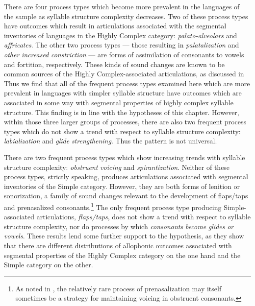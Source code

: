   There are four process types which become more prevalent in the languages of the sample as syllable structure complexity decreases. Two of these process types have outcomes which result in articulations associated with the segmental inventories of languages in the Highly Complex category: \textit{palato-alveolars} and \textit{affricates}. The other two process types — those resulting in \textit{palatalization} and \textit{other} \textit{increased} \textit{constriction} — are forms of assimilation of consonants to vowels and fortition, respectively. These kinds of sound changes are known to be common sources of the Highly Complex-associated articulations, as discussed in  Thus we find that all of the frequent process types examined here which are more prevalent in languages with simpler syllable structure have outcomes which are associated in some way with segmental properties of highly complex syllable structure. This finding is in line with the hypotheses of this chapter. However, within those three larger groups of processes, there are also two frequent process types which do not show a trend with respect to syllable structure complexity: \textit{labialization} and \textit{glide} \textit{strengthening}. Thus the pattern is not universal.

  There are two frequent process types which show increasing trends with syllable structure complexity: \textit{obstruent} \textit{voicing} and \textit{spirantization}. Neither of these process types, strictly speaking, produces articulations associated with segmental inventories of the Simple category. However, they are both forms of lenition or sonorization, a family of sound changes relevant to the development of flaps/taps and prenasalized consonants.\footnote{ \textrm{As noted in , the relatively rare process of prenasalization may itself sometimes be a strategy for maintaining voicing in obstruent consonants.}} The only frequent process type producing Simple-associated articulations, \textit{flaps/taps}, does not show a trend with respect to syllable structure complexity, nor do processes by which \textit{consonants} \textit{become} \textit{glides} \textit{or} \textit{vowels}. These results lend some further support to the hypothesis, as they show that there are different distributions of allophonic outcomes associated with segmental properties of the Highly Complex category on the one hand and the Simple category on the other.

